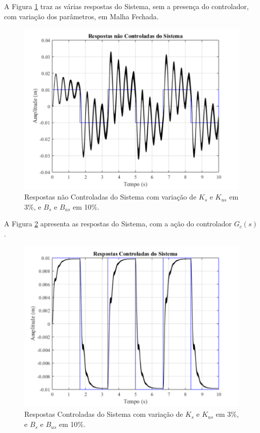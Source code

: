 \documentclass[journal,brazil,english]{IEEEtran}
\begin{document}
A Figura \ref{sistemaIntervalar} traz as várias respostas do Sistema, sem a presença do controlador, com variação dos parâmetros, em Malha Fechada.
\begin{figure}[H]
	\centering
\includegraphics[width=\columnwidth]{./imagens/resposta_sistema_variando_Ks_Kus_Bs_Bus.pdf}
    \renewcommand{\figurename}{Fig.}
    \caption{Respostas não Controladas do Sistema com variação de $K_s$ e $K_{us}$ em 3\%, e $B_s$ e $B_{us}$ em 10\%.}
	\label{sistemaIntervalar}
\end{figure}

A Figura \ref{controladaIntervalar} apresenta as respostas do Sistema, com a ação do controlador $G_c(s)$.
\begin{figure}[H]
	\centering
\includegraphics[width=\columnwidth]{./imagens/resposta_controlada_variando_Ks_Kus_Bs_Bus_controlador_sem_robustez.pdf}
    \renewcommand{\figurename}{Fig.}
    \caption{Respostas Controladas do Sistema com variação de $K_s$ e $K_{us}$ em 3\%, e $B_s$ e $B_{us}$ em 10\%.}
	\label{controladaIntervalar}
\end{figure}
\end{document}
